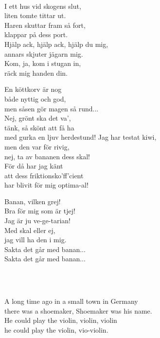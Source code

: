 {{%

\vspace{0.15cm}
\melo{}\\
\songtext{}I ett hus vid skogens slut,\\
liten tomte tittar ut.\\
Haren skuttar fram så fort,\\
klappar på dess port.\\
Hjälp ack, hjälp ack, hjälp du mig,\\
annars skjuter jägarn mig.\\
Kom, ja, kom i stugan in,\\
räck mig handen din.

En köttkorv är nog\\
både nyttig och god,\\
men såsen gör magen så rund...\\
Nej, grönt ska det va',\\
tänk, så skönt att få ha\\
med gurka en ljuv herdestund!
\newpage
Jag har testat kiwi,\\
men den var för rivig,\\
nej, ta av bananen dess skal!\\
För då har jag känt\\
att dess friktionsko'ff'cient\\
har blivit för mig optima-al!

Banan, vilken grej!\\
Bra för mig som är tjej!\\
Jag är ju ve-ge-tarian!\\
Med skal eller ej,\\
jag vill ha den i mig.\\
Sakta det går med banan...\\
Sakta det går med banan...

 \\


 \\       

\songtext{}
A long time ago in a small town in Germany\\
there was a shoemaker, Shoemaker was his name.\\
He could play the violin, violin, violin\\
he could play the violin, vio-violin.

}}

